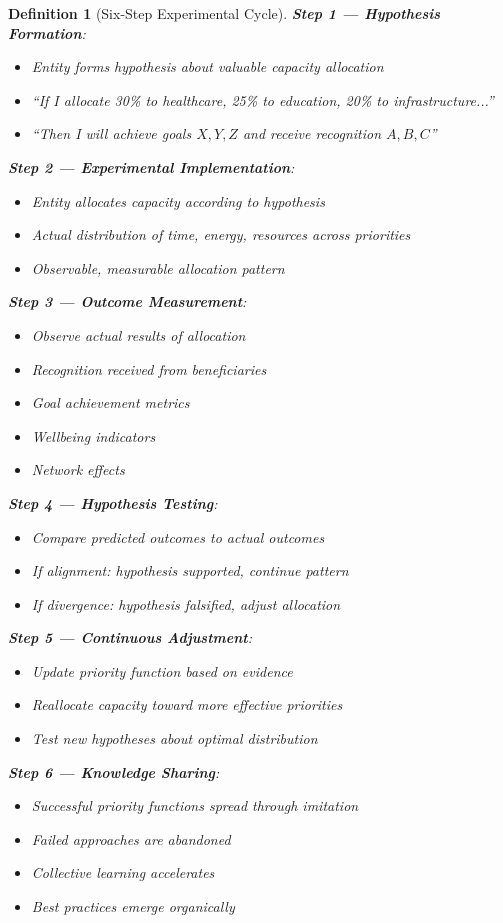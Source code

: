 \documentclass[11pt]{article}
\newtheorem{definition}{Definition}
\begin{document}
\begin{definition}[Six-Step Experimental Cycle]
\textbf{Step 1 — Hypothesis Formation}:
\begin{itemize}
\item Entity forms hypothesis about valuable capacity allocation
\item ``If I allocate 30\% to healthcare, 25\% to education, 20\% to infrastructure...''
\item ``Then I will achieve goals $X, Y, Z$ and receive recognition $A, B, C$''
\end{itemize}

\textbf{Step 2 — Experimental Implementation}:
\begin{itemize}
\item Entity allocates capacity according to hypothesis
\item Actual distribution of time, energy, resources across priorities
\item Observable, measurable allocation pattern
\end{itemize}

\textbf{Step 3 — Outcome Measurement}:
\begin{itemize}
\item Observe actual results of allocation
\item Recognition received from beneficiaries
\item Goal achievement metrics
\item Wellbeing indicators
\item Network effects
\end{itemize}

\textbf{Step 4 — Hypothesis Testing}:
\begin{itemize}
\item Compare predicted outcomes to actual outcomes
\item If alignment: hypothesis supported, continue pattern
\item If divergence: hypothesis falsified, adjust allocation
\end{itemize}

\textbf{Step 5 — Continuous Adjustment}:
\begin{itemize}
\item Update priority function based on evidence
\item Reallocate capacity toward more effective priorities
\item Test new hypotheses about optimal distribution
\end{itemize}

\textbf{Step 6 — Knowledge Sharing}:
\begin{itemize}
\item Successful priority functions spread through imitation
\item Failed approaches are abandoned
\item Collective learning accelerates
\item Best practices emerge organically
\end{itemize}
\end{definition}
\end{document}
